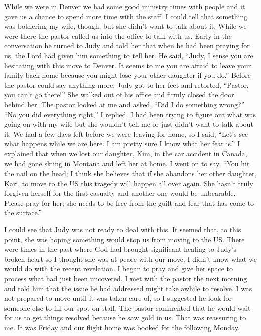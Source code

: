 \documentclass[oneside]{book}
\begin{document}
While we were in Denver we had some good ministry times with people and it gave us a chance to spend more time with the staff. I could tell that something was bothering my wife, though, but she didn’t want to talk about it. While we were there the pastor called us into the office to talk with us. Early in the conversation he turned to Judy and told her that when he had been praying for us, the Lord had given him something to tell her. He said, “Judy, I sense you are hesitating with this move to Denver. It seems to me you are afraid to leave your family back home because you might lose your other daughter if you do.” Before the pastor could say anything more, Judy got to her feet and retorted, “Pastor, you can’t go there!” She walked out of his office and firmly closed the door behind her. The pastor looked at me and asked, “Did I do something wrong?” “No you did everything right,” I replied. I had been trying to figure out what was going on with my wife but she wouldn’t tell me or just didn’t want to talk about it. We had a few days left before we were leaving for home, so I said, “Let’s see what happens while we are here. I am pretty sure I know what her fear is.” I explained that when we lost our daughter, Kim, in the car accident in Canada, we had gone skiing in Montana and left her at home. I went on to say, “You hit the nail on the head; I think she believes that if she abandons her other daughter, Kari, to move to the US this tragedy will happen all over again. She hasn’t truly forgiven herself for the first casualty and another one would be unbearable. Please pray for her; she needs to be free from the guilt and fear that has come to the surface.”

I could see that Judy was not ready to deal with this. It seemed that, to this point, she was hoping something would stop us from moving to the US. There were times in the past where God had brought significant healing to Judy’s broken heart so I thought she was at peace with our move. I didn’t know what we would do with the recent revelation. I began to pray and give her space to process what had just been uncovered. I met with the pastor the next morning and told him that the issue he had addressed might take awhile to resolve. I was not prepared to move until it was taken care of, so I suggested he look for someone else to fill our spot on staff. The pastor commented that he would wait for us to get things resolved because he saw gold in us. That was reassuring to me. It was Friday and our flight home was booked for the following Monday.
\end{document}

